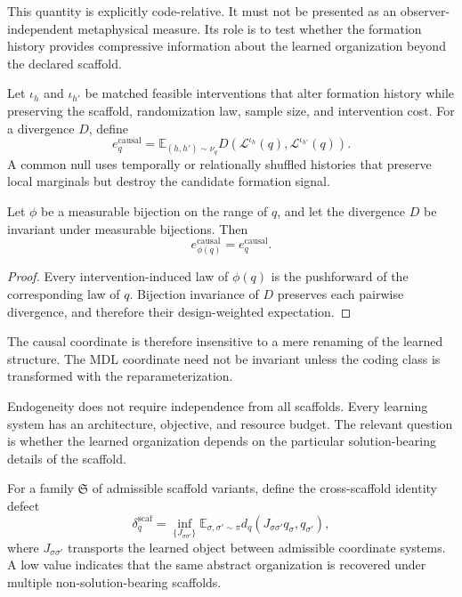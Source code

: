 This quantity is explicitly code-relative. It must not be presented as an
observer-independent metaphysical measure. Its role is to test whether the
formation history provides compressive information about the learned
organization beyond the declared scaffold.

\begin{SRWTdefinition}\label{SRWT:def:causal-formation-sensitivity}
Let \(\iota_h\) and \(\iota_{h'}\) be matched feasible interventions that alter
formation history while preserving the scaffold, randomization law, sample
size, and intervention cost. For a divergence \(D\), define
\[
\boxed{
 e_q^{\mathrm{causal}}
 =
 \mathbb E_{(h,h')\sim\nu_q}
 D\!\left(
 \mathcal L^{\iota_h}(q),
 \mathcal L^{\iota_{h'}}(q)
 \right).
}
\]
A common null uses temporally or relationally shuffled histories that preserve
local marginals but destroy the candidate formation signal.
\end{SRWTdefinition}

\begin{SRWTproposition}
\label{SRWT:prop:causal-provenance-invariance}
Let \(\phi\) be a measurable bijection on the range of \(q\), and let the
divergence \(D\) be invariant under measurable bijections. Then
\[
 e_{\phi(q)}^{\mathrm{causal}}
 =
 e_q^{\mathrm{causal}}.
\]
\end{SRWTproposition}

\begin{proof}
Every intervention-induced law of \(\phi(q)\) is the pushforward of the
corresponding law of \(q\). Bijection invariance of \(D\) preserves each
pairwise divergence, and therefore their design-weighted expectation.
\end{proof}

The causal coordinate is therefore insensitive to a mere renaming of the
learned structure. The MDL coordinate need not be invariant unless the coding
class is transformed with the reparameterization.


Endogeneity does not require independence from all scaffolds. Every learning
system has an architecture, objective, and resource budget. The relevant
question is whether the learned organization depends on the particular
solution-bearing details of the scaffold.

For a family \(\mathfrak S\) of admissible scaffold variants, define the
cross-scaffold identity defect
\[
\boxed{
\delta_q^{\mathrm{scaf}}
=
\inf_{\{J_{\sigma\sigma'}\}}
\mathbb E_{\sigma,\sigma'\sim\pi}
 d_q
\left(
J_{\sigma\sigma'}q_{\sigma},q_{\sigma'}
\right),
}
\]
where \(J_{\sigma\sigma'}\) transports the learned object between admissible
coordinate systems. A low value indicates that the same abstract
organization is recovered under multiple non-solution-bearing scaffolds.

